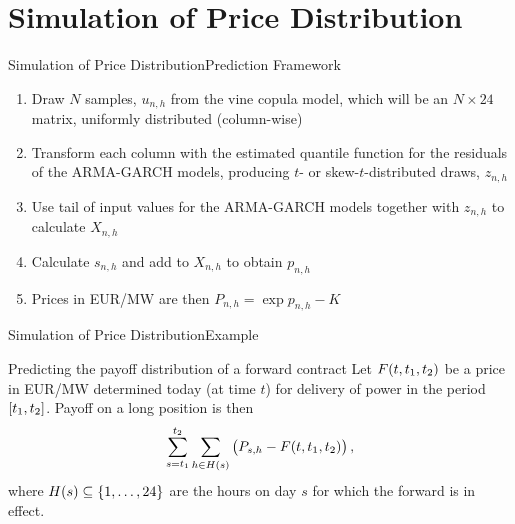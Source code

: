 \section{Simulation of Price Distribution}
\label{sec:simulation}

\begin{frame}{Simulation of Price Distribution}{Prediction Framework}
  \begin{enumerate}
  \item<2-> Draw \(N\) samples, \(u_{n,h}\) from the vine copula model, which will be an \(N \times 24\) matrix, uniformly distributed (column-wise)
  \item<3-> Transform each column with the estimated quantile function for the residuals of the ARMA-GARCH models, producing \(t\)- or skew-\(t\)-distributed draws, \(z_{n,h}\)
  \item<4-> Use tail of input values for the ARMA-GARCH models together with \(z_{n,h}\) to calculate \(X_{n,h}\)
  \item<5-> Calculate \(s_{n,h}\) and add to \(X_{n,h}\) to obtain \(p_{n,h}\)
  \item<6-> Prices in EUR/MW are then \(P_{n,h} = \exp p_{n,h} - K\)
  \end{enumerate}
\end{frame}

\begin{frame}{Simulation of Price Distribution}{Example}
  \begin{block}{Predicting the payoff distribution of a forward contract}
    Let \(F\of{t, t_{1}, t_{2}}\) be a price in EUR/MW determined today (at time \(t\)) for delivery of power in the period \(\intcc{t_{1}, t_{2}}\).
    Payoff on a long position is then
    \begin{equation*}
      \sum_{s=t_{1}}^{t_{2}} \sum_{h\in H(s)} \del{P_{s,h} - F\of{t, t_{1}, t_{2}}},
    \end{equation*}
    where \(H(s) \subseteq \cbr{1,\dotsc,24}\) are the hours on day \(s\) for which the forward is in effect.
  \end{block}
\end{frame}

